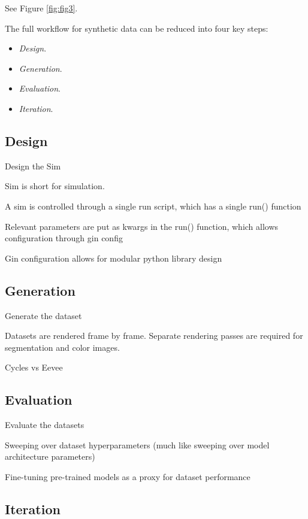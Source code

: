 \documentclass{article}
\begin{document}
See Figure \ref{fig:fig3}.

The full workflow for synthetic data can be reduced into four key steps:

\begin{itemize}
	\item \emph{Design}.
	\item \emph{Generation}.
	\item \emph{Evaluation}.
	\item \emph{Iteration}.
\end{itemize}

\subsection{Design}
\label{sec:worflowdesign}

Design the Sim

Sim is short for simulation.

A sim is controlled through a single run script, which has a single run() function

Relevant parameters are put as kwargs in the run() function, which allows configuration through gin config

Gin configuration allows for modular python library design

\subsection{Generation}
\label{sec:generation}

Generate the dataset

Datasets are rendered frame by frame. Separate rendering passes are required for segmentation and color images.

Cycles vs Eevee

\subsection{Evaluation}
\label{sec:evaluation}

Evaluate the datasets

Sweeping over dataset hyperparameters (much like sweeping over model architecture parameters)

Fine-tuning pre-trained models as a proxy for dataset performance

\subsection{Iteration}
\label{sec:iteration}
\end{document}

